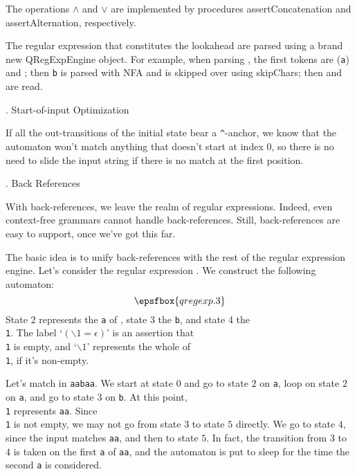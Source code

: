 The operations $\land$ and $\lor$ are implemented by procedures {\sf assertConcatenation} and {\sf assertAlternation}, respectively.

The regular expression that constitutes the lookahead are parsed using a brand new {\sf QRegExpEngine} object.  For example, when parsing , the first tokens are  ({\tt a}) and ; then {\tt b} is parsed with NFA and is skipped over using {\sf skipChars}; then \lex{)} and  are read.

. Start-of-input Optimization

If all the out-transitions of the initial state bear a {\tt\^}-anchor, we know that the automaton won't match anything that doesn't start at index 0, so there is no need to slide the input string if there is no match at the first position.

. Back References

With back-references, we leave the realm of regular expressions.  Indeed, even context-free grammars cannot handle back-references.  Still, back-references are easy to support, once we've got this far.

The basic idea is to unify back-references with the rest of the regular expression engine.  Let's consider the regular expression .  We construct the following automaton:  $$\epsfbox{qregexp.3}$$  State 2 represents the {\tt a} of , state 3 the {\tt b}, and state 4 the {\tt \\1}.  The label `$(\backslash1 = \epsilon)$' is an assertion that {\tt \\1} is empty, and `$\backslash1$' represents the whole of {\tt \\1}, if it's non-empty.

Let's match  in {\tt aabaa}.  We start at state $0$ and go to state $2$ on {\tt a}, loop on state $2$ on {\tt a}, and go to state $3$ on {\tt b}.  At this point, {\tt \\1} represents {\tt aa}.  Since {\tt \\1} is not empty, we may not go from state $3$ to state $5$ directly.  We go to state $4$, since the input matches {\tt aa}, and then to state $5$.  In fact, the transition from $3$ to $4$ is taken on the first {\tt a} of {\tt aa}, and the automaton is put to sleep for the time the second {\tt a} is considered.

